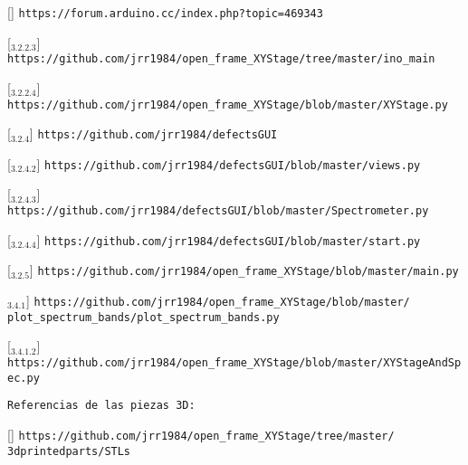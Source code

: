 [\href{https://forum.arduino.cc/index.php?topic=469343}{\faCode}] \texttt{https://forum.arduino.cc/index.php?topic=469343}

[\href{https://github.com/jrr1984/open\_frame\_XYStage/tree/master/ino\_main}{\faGithub$_{3.2.2.3}$}] \texttt{https://github.com/jrr1984/open\_frame\_XYStage/tree/master/ino\_main}

[\href{https://github.com/jrr1984/open\_frame\_XYStage/blob/master/XYStage.py}{\faGithub$_{3.2.2.4}$}] \texttt{https://github.com/jrr1984/open\_frame\_XYStage/blob/master/XYStage.py}

[\href{https://github.com/jrr1984/defectsGUI}{\faGithub$_{3.2.4}$}] \texttt{https://github.com/jrr1984/defectsGUI}

[\href{https://github.com/jrr1984/defectsGUI/blob/master/views.py}{\faGithub$_{3.2.4.2}$}] \texttt{https://github.com/jrr1984/defectsGUI/blob/master/views.py}

[\href{https://github.com/jrr1984/defectsGUI/blob/master/Spectrometer.py}{\faGithub$_{3.2.4.3}$}] \texttt{https://github.com/jrr1984/defectsGUI/blob/master/Spectrometer.py}

[\href{https://github.com/jrr1984/defectsGUI/blob/master/start.py}{\faGithub$_{3.2.4.4}$}] \texttt{https://github.com/jrr1984/defectsGUI/blob/master/start.py}

[\href{https://github.com/jrr1984/open\_frame\_XYStage/blob/master/main.py}{\faGithub$_{3.2.5}$}] \texttt{https://github.com/jrr1984/open\_frame\_XYStage/blob/master/main.py}

\href{https://github.com/jrr1984/open\_frame\_XYStage/blob/master/plot\_spectrum\_bands/plot\_spectrum\_bands.py}{\faGithub$_{3.4.1}$}] \texttt{https://github.com/jrr1984/open\_frame\_XYStage/blob/master/\\\hspace{1.5cm}plot\_spectrum\_bands/plot\_spectrum\_bands.py}

[\href{https://github.com/jrr1984/open\_frame\_XYStage/blob/master/XYStageAndSpec.py}{\faGithub$_{3.4.1.2}$}] \texttt{https://github.com/jrr1984/open\_frame\_XYStage/blob/master/XYStageAndSpec.py}

\texttt{Referencias de las piezas 3D:}

[\href{https://github.com/jrr1984/open\_frame\_XYStage/tree/master/3dprintedparts/STLs}{\faCubes}] \texttt{https://github.com/jrr1984/open\_frame\_XYStage/tree/master/\\\hspace{1.5cm}3dprintedparts/STLs}

